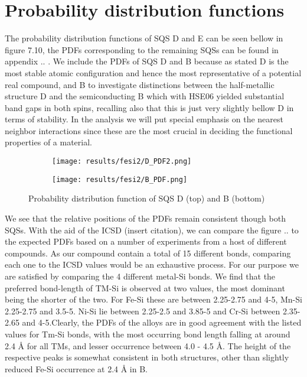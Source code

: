 \newpage
\section{Probability distribution functions}
The probability distribution functions of SQS D and E can be seen bellow in figure 7.10, the PDFs corresponding to the remaining SQSs can be found in appendix .. . We include the PDFs of SQS D and B because as stated D is the most stable atomic configuration and hence the most representative of a potential real compound, and B to investigate distinctions between the half-metallic structure D and the semiconducting B which with HSE06 yielded substantial band gaps in both spins, recalling also that this is just very slightly bellow D in terms of stability. In the analysis we will put special emphasis on the nearest neighbor interactions since these are the most crucial in deciding the functional properties of a material. 
 
\begin{figure}[H]
	\centering
	\begin{subfigure}{\textwidth}
		\texttt{[image: results/fesi2/D\_PDF2.png]}
	\end{subfigure}
	\begin{subfigure}{\textwidth}
		\texttt{[image: results/fesi2/B\_PDF.png]}
	\end{subfigure}
	\caption{Probability distribution function of SQS D (top) and B (bottom)}
\end{figure}

We see that the relative positions of the PDFs remain consistent though both SQSs. With the aid of the ICSD (insert citation), we can compare the figure .. to the expected PDFs based on a number of experiments from a host of different compounds. As our compound contain a total of 15 different bonds, comparing each one to the ICSD values would be an exhaustive process. For our purpose we are satisfied by comparing the 4 different metal-Si bonds. We find that the preferred bond-length of TM-Si is observed at two values, the most dominant being the shorter of the two. For Fe-Si these are between 2.25-2.75 and 4-5, Mn-Si 2.25-2.75 and 3.5-5. Ni-Si lie between 2.25-2.5 and 3.85-5 and Cr-Si between 2.35-2.65 and 4-5.Clearly, the PDFs of the alloys are in good agreement with the listed values for Tm-Si bonds, with the most occurring bond length falling at around 2.4 Å for all TMs, and lesser occurrence between 4.0 - 4.5 Å. The height of the respective peaks is somewhat consistent in both structures, other than slightly reduced Fe-Si occurrence at 2.4 Å in B.

